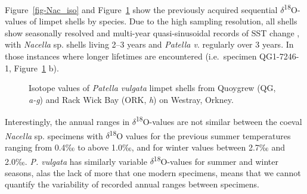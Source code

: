 \documentclass[
  authoryear,
  preprint,
  3p]{elsarticle}
\begin{document}
Figure~\ref{fig-Nac_iso} and Figure~\ref{fig-Pat_iso} show the
previously acquired sequential \(\delta\)\textsuperscript{18}O-values of
limpet shells by species. Due to the high sampling resolution, all
shells show seasonally resolved and multi-year quasi-sinusoidal records
of SST change , with \emph{Nacella} sp. shells living 2--3 years and
\emph{Patella v}. regularly over 3 years. In those instances where
longer lifetimes are encountered (i.e.~specimen QG1-7246-1,
Figure~\ref{fig-Pat_iso} b).

\begin{figure}[H]


\caption{\label{fig-Pat_iso}Isotope values of \emph{Patella vulgata}
limpet shells from Quoygrew (QG, \emph{a-g}) and Rack Wick Bay (ORK,
\emph{h}) on Westray, Orkney.}

\end{figure}%

Interestingly, the annual ranges in
\(\delta\)\textsuperscript{18}O-values are not similar between the
coeval \emph{Nacella} sp. specimens with \(\delta\)\textsuperscript{18}O
values for the previous summer temperatures ranging from 0.4‰ to above
1.0‰, and for winter values between 2.7‰ and 2.0‰. \emph{P. vulgata} has
similarly variable \(\delta\)\textsuperscript{18}O-values for summer and
winter seasons, alas the lack of more that one modern specimens, means
that we cannot quantify the variability of recorded annual ranges
between specimens.
\end{document}
